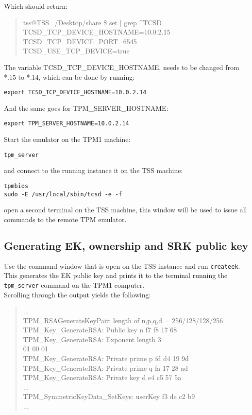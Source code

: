 \documentclass[10pt]{article}
\newcommand{\command}[1]{\texttt{#1}}
\begin{document}
      Which should return:

      \begin{quote}
        tss@TSS ~/Desktop/share \$ set | grep \textasciicircum TCSD\\
        TCSD\_TCP\_DEVICE\_HOSTNAME=10.0.2.15\\
        TCSD\_TCP\_DEVICE\_PORT=6545\\
        TCSD\_USE\_TCP\_DEVICE=true
      \end{quote}

      The variable TCSD\_TCP\_DEVICE\_HOSTNAME, needs to be changed from *.15 to
      *.14, which can be done by running:

      \command{export TCSD\_TCP\_DEVICE\_HOSTNAME=10.0.2.14}

      And the same goes for TPM\_SERVER\_HOSTNAME:

      \command{export TPM\_SERVER\_HOSTNAME=10.0.2.14}

      Start the emulator on the TPM1 machine:

      \command{tpm\_server}

      and connect to the running instance it on the TSS machine:

      \command{tpmbios} \\
      \command{sudo -E /usr/local/sbin/tcsd -e -f}

      open a second terminal on the TSS machine, this window will be used to
      issue all commands to the remote TPM emulator.

    \subsection{Generating EK, ownership and SRK public key}

      Use the command-window that is open on the TSS instance and run
      \command{createek}. This generates the EK public key and prints
      it to the terminal running the \command{tpm\_server} command
      on the TPM1 computer. \\

      Scrolling through the output yields the following:

      \begin{quote}
        ...\\
        TPM\_RSAGenerateKeyPair: length of n,p,q,d = 256/128/128/256\\
        TPM\_Key\_GenerateRSA: Public key n f7 f8 17 68\\
        TPM\_Key\_GenerateRSA: Exponent length 3\\
        01 00 01 \\
        TPM\_Key\_GenerateRSA: Private prime p fd d4 19 9d\\
        TPM\_Key\_GenerateRSA: Private prime q fa 17 28 ad\\
        TPM\_Key\_GenerateRSA: Private key d e4 c5 57 5a\\
        ...\\
        TPM\_SymmetricKeyData\_SetKeys: userKey f3 de c2 b9\\
        ...
      \end{quote}
\end{document}
